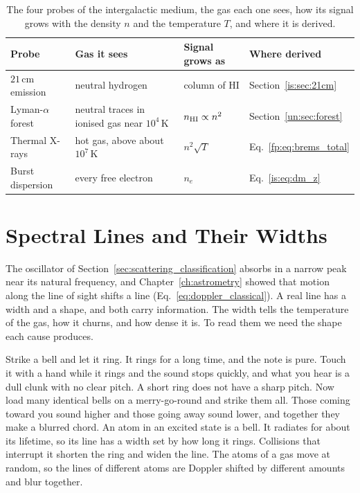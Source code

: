 \begin{table}[htbp]
	\centering
	\small
	\begin{tabular}{@{}l l l l@{}}
		\toprule
		\textbf{Probe} & \textbf{Gas it sees} & \textbf{Signal grows as} & \textbf{Where derived} \\
		\midrule
		$21\,\mathrm{cm}$ emission & neutral hydrogen & column of HI & Section~\ref{is:sec:21cm} \\
		Lyman-$\alpha$ forest & neutral traces in ionised gas near $10^4\,\mathrm K$ & $n_{\rm HI}\propto n^2$ & Section~\ref{un:sec:forest} \\
		Thermal X-rays & hot gas, above about $10^7\,\mathrm K$ & $n^2\sqrt T$ & Eq.~\eqref{fp:eq:brems_total} \\
		Burst dispersion & every free electron & $n_e$ & Eq.~\eqref{is:eq:dm_z} \\
		\bottomrule
	\end{tabular}
	\caption{The four probes of the intergalactic medium, the gas each one sees, how its signal grows with the density $n$ and the temperature $T$, and where it is derived.}
	\label{is:tab:igm_probes}
\end{table}

\section{Spectral Lines and Their Widths}
\label{sec:ism_lines}

The oscillator of Section~\ref{sec:scattering_classification} absorbs in a narrow peak near its natural frequency, and Chapter~\ref{ch:astrometry} showed that motion along the line of sight shifts a line (Eq.~\eqref{eq:doppler_classical}). A real line has a width and a shape, and both carry information. The width tells the temperature of the gas, how it churns, and how dense it is. To read them we need the shape each cause produces.

Strike a bell and let it ring. It rings for a long time, and the note is pure. Touch it with a hand while it rings and the sound stops quickly, and what you hear is a dull clunk with no clear pitch. A short ring does not have a sharp pitch. Now load many identical bells on a merry-go-round and strike them all. Those coming toward you sound higher and those going away sound lower, and together they make a blurred chord. An atom in an excited state is a bell. It radiates for about its lifetime, so its line has a width set by how long it rings. Collisions that interrupt it shorten the ring and widen the line. The atoms of a gas move at random, so the lines of different atoms are Doppler shifted by different amounts and blur together.

